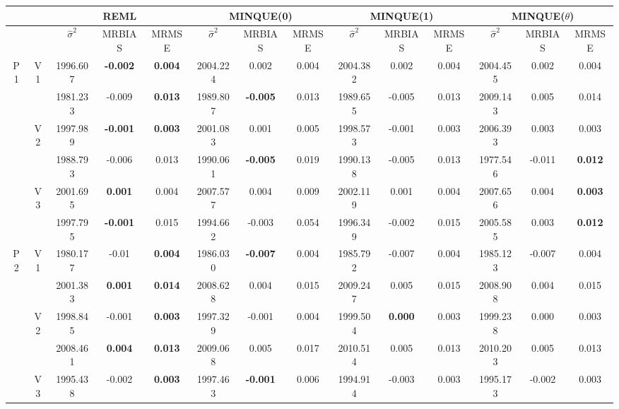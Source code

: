 \documentclass[12pt,a4paper]{article}
\begin{document}
\begin{sidewaystable}[ht]
\centering
{\footnotesize
\begin{tabular}{cc|ccc|ccc|ccc|ccc|}
   & & \multicolumn{3}{c|}{REML}&\multicolumn{3}{c|}{MINQUE(0)}&\multicolumn{3}{c|}{MINQUE(1)}&\multicolumn{3}{c|}{MINQUE($\theta$)}\\ \hline
 &  & $\hat{\sigma}^2$ & MRBIAS & MRMSE & $\hat{\sigma}^2$ & MRBIAS & MRMSE & $\hat{\sigma}^2$ & MRBIAS & MRMSE & $\hat{\sigma}^2$ & MRBIAS & MRMSE \\ 
  \hline
\multirow{6}{*}{P1} & \multirow{2}{*}{V1} & 1996.607 & \textbf{-0.002} & \textbf{0.004} & 2004.224 & 0.002 & 0.004 & 2004.382 & 0.002 & 0.004 & 2004.455 & 0.002 & 0.004 \\ 
   &  & 1981.233 & -0.009 & \textbf{0.013} & 1989.807 & \textbf{-0.005} & 0.013 & 1989.655 & -0.005 & 0.013 & 2009.143 & 0.005 & 0.014 \\ 
   & \multirow{2}{*}{V2} & 1997.989 & \textbf{-0.001} & \textbf{0.003} & 2001.083 & 0.001 & 0.005 & 1998.573 & -0.001 & 0.003 & 2006.393 & 0.003 & 0.003 \\ 
   &  & 1988.793 & -0.006 & 0.013 & 1990.061 & \textbf{-0.005} & 0.019 & 1990.138 & -0.005 & 0.013 & 1977.546 & -0.011 & \textbf{0.012} \\ 
   & \multirow{2}{*}{V3} & 2001.695 & \textbf{0.001} & 0.004 & 2007.577 & 0.004 & 0.009 & 2002.119 & 0.001 & 0.004 & 2007.656 & 0.004 & \textbf{0.003} \\ 
   &  & 1997.795 & \textbf{-0.001} & 0.015 & 1994.662 & -0.003 & 0.054 & 1996.349 & -0.002 & 0.015 & 2005.585 & 0.003 & \textbf{0.012} \\ 
   \hline \hline\multirow{6}{*}{P2} & \multirow{2}{*}{V1} & 1980.177 & -0.01 & \textbf{0.004} & 1986.030 & \textbf{-0.007} & 0.004 & 1985.792 & -0.007 & 0.004 & 1985.123 & -0.007 & 0.004 \\ 
   &  & 2001.383 & \textbf{0.001} & \textbf{0.014} & 2008.628 & 0.004 & 0.015 & 2009.247 & 0.005 & 0.015 & 2008.908 & 0.004 & 0.015 \\ 
   & \multirow{2}{*}{V2} & 1998.845 & -0.001 & \textbf{0.003} & 1997.329 & -0.001 & 0.004 & 1999.504 & \textbf{0.000} & 0.003 & 1999.238 & 0.000 & 0.003 \\ 
   &  & 2008.461 & \textbf{0.004} & \textbf{0.013} & 2009.068 & 0.005 & 0.017 & 2010.514 & 0.005 & 0.013 & 2010.203 & 0.005 & 0.013 \\ 
   & \multirow{2}{*}{V3} & 1995.438 & -0.002 & \textbf{0.003} & 1997.463 & \textbf{-0.001} & 0.006 & 1994.914 & -0.003 & 0.003 & 1995.173 & -0.002 & 0.003 \\ 

\end{tabular}}
\end{sidewaystable}
\end{document}
